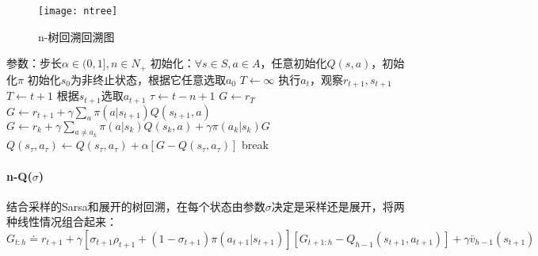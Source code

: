 \documentclass[
12pt, %
a4paper, 
oneside, %
headinclude,footinclude, %
]{scrartcl}
\begin{document}
\begin{figure}[H]
\centering
\texttt{[image: ntree]}
\caption[n-树回溯回溯图]{n-树回溯回溯图}
\end{figure}
\begin{myalgorithm}[n-树回溯]
\State 参数：步长$ \alpha \in (0,1], n \in N_+ $
\State 初始化：$ \forall s \in S, a \in A $，任意初始化$ Q(s, a) $，初始化$ \pi $
\State 初始化$ s_0 $为非终止状态，根据它任意选取$ a_0 $
\State $ T \gets \infty $
\State 执行$ a_t $，观察$ r_{t + 1}, s_{t + 1} $
\State $ T \gets t + 1 $
\Else
\State 根据$ s_{t + 1} $选取$ a_{t + 1} $
\EndIf
\EndIf
\State $ \tau \gets t - n + 1 $ 
\State $ G \gets r_T $ 
\Else
\State $ G \gets r_{t + 1} + \gamma \sum_a \pi(a|s_{t + 1})Q(s_{t + 1}, a) $
\EndIf
{}
\State $ G \gets r_k + \gamma \sum_{a \neq a_k} \pi(a|s_k)Q(s_k,a) + \gamma \pi(a_k|s_k)G $
\EndFor
\State $ Q(s_{\tau}, a_{\tau}) \gets Q(s_{\tau}, a_{\tau}) + \alpha[G - Q(s_{\tau}, a_{\tau})] $
\EndIf
{}
\State break
\EndIf
\EndFor
\EndFor
\end{myalgorithm}
\paragraph{n-Q($ \sigma $)}
结合采样的Sarsa和展开的树回溯，在每个状态由参数$ \sigma $决定是采样还是展开，将两种线性情况组合起来：
$$ G_{t:h} \doteq r_{t + 1} + \gamma [\sigma_{t + 1}\rho_{t + 1} + (1 - \sigma_{t + 1})\pi(a_{t + 1}|s_{t + 1})][G_{t + 1:h} - Q_{h - 1}(s_{t + 1}, a_{t + 1})] + \gamma \bar{v}_{h - 1}(s_{t + 1}) $$
\end{document}
